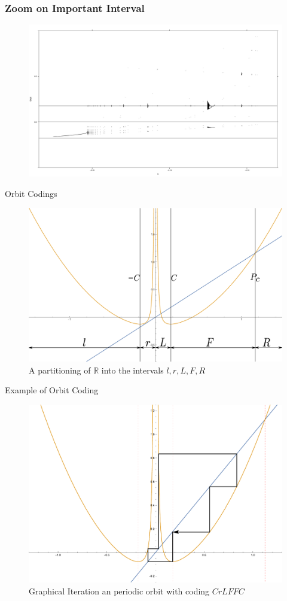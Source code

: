 \documentclass{beamer}
\newcommand{\R}{\mathbb{R}}
\newcommand{\<}{\left\langle}
\renewcommand{\>}{\right\rangle} %
\renewcommand{\*}{\cdot} %
\begin{document}
\begin{frame}
	\frametitle{Zoom on Important Interval}
	\begin{figure}
			\includegraphics[width = \textwidth]{./img/over_plain}
	\end{figure}
\end{frame}

\begin{frame}{Orbit Codings}
	\begin{figure}
		\centering
		\includegraphics[width=.8\textwidth]{./img/codings}
		\caption{A partitioning of $\R$ into the intervals $l, r, L, F, R$}
	\end{figure}
\end{frame}

\begin{frame}{Example of Orbit Coding}
	\begin{figure}[h]
		\centering
		\includegraphics[width=.8\textwidth]{./img/orbitex}
		\caption{Graphical Iteration an periodic orbit with coding $CrLFFC$}
	\end{figure}
\end{frame}
\end{document}
